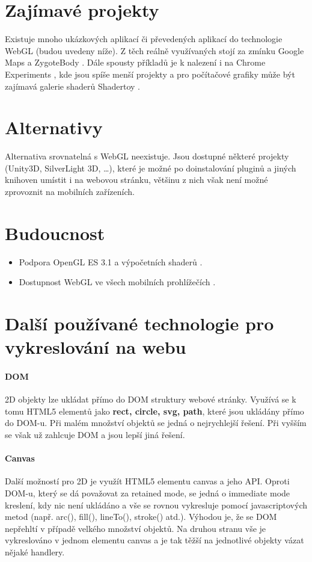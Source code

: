 \documentclass[12pt,a4paper,titlepage,final]{report}
\begin{document}
\section{Zajímavé projekty}
Existuje mnoho ukázkových aplikací či převedených aplikací do technologie WebGL (budou uvedeny níže). Z těch reálně využívaných stojí za zmínku Google Maps \cite{maps} a ZygoteBody \cite{zygotebody}. Dále spousty příkladů je k nalezení i na Chrome Experiments \cite{chromeexperiments}, kde jsou spíše menší projekty a pro počítačové grafiky může být zajímavá galerie shaderů Shadertoy \cite{shadertoy}.

\section{Alternativy}
Alternativa srovnatelná s WebGL neexistuje. Jsou dostupné některé projekty (Unity3D, SilverLight 3D, \dots), které je možné po doinstalování pluginů a jiných knihoven umístit i na webovou stránku, většinu z nich však není možné zprovoznit na mobilních zařízeních.

\section{Budoucnost}
\begin{itemize}
	\item Podpora OpenGL ES 3.1 a výpočetních shaderů \cite{future}.
	\item Dostupnost WebGL ve všech mobilních prohlížečích \cite{future}.	
\end{itemize}

\section{Další používané technologie pro vykreslování na webu}

\paragraph{DOM} 2D objekty lze ukládat přímo do DOM struktury webové stránky. Využívá se k tomu HTML5 elementů jako \textbf{rect, circle, svg, path}, které jsou ukládány přímo do DOM-u. Při malém množství objektů se jedná o nejrychlejší řešení. Při vyšším se však už zahlcuje DOM a jsou lepší jiná řešení.

\paragraph{Canvas} Další možností pro 2D je využít HTML5 elementu canvas a jeho API. Oproti DOM-u, který se dá považovat za retained mode, se jedná o immediate mode kreslení, kdy nic není ukládáno a vše se rovnou vykresluje pomocí javascriptových metod (např. arc(), fill(), lineTo(),  stroke() atd.). Výhodou je, že se DOM nepřehltí v případě velkého množství objektů. Na druhou stranu vše je vykreslováno v jednom elementu canvas a je tak těžší na jednotlivé objekty vázat nějaké handlery.
\end{document}
